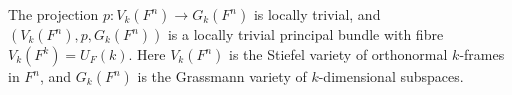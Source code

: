The projection $p: V_k(F^n) \to G_k(F^n)$ is locally trivial, and $(V_k(F^n), p, G_k(F^n))$ is a locally trivial principal bundle with fibre $V_k(F^k) = U_F(k)$. Here $V_k(F^n)$ is the Stiefel variety of orthonormal $k$-frames in $F^n$, and $G_k(F^n)$ is the Grassmann variety of $k$-dimensional subspaces.
